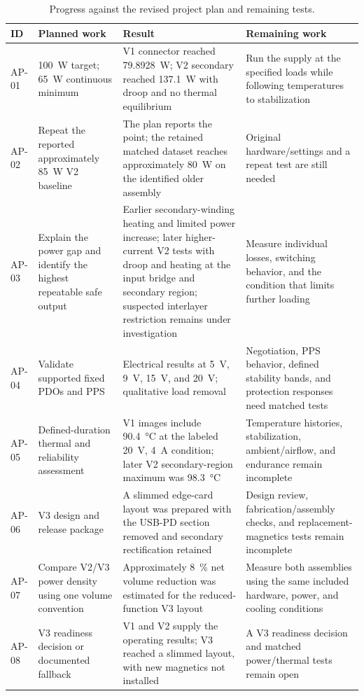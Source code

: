 \begin{table}[htbp]
\centering
\caption[Progress against the revised plan.]{Progress against the revised project plan and remaining tests.}
\label{tab:revised-plan-results-status}
\scriptsize
\begin{tabularx}{\textwidth}{@{}L{0.07\textwidth}L{0.24\textwidth}Y L{0.23\textwidth}@{}}
\toprule
ID & Planned work & Result & Remaining work\\
\midrule
AP-01 & \SI{100}{\watt} target; \SI{65}{\watt} continuous minimum & V1 connector reached \SI{79.8928}{\watt}; V2 secondary reached \SI{137.1}{\watt} with droop and no thermal equilibrium & Run the supply at the specified loads while following temperatures to stabilization\\
AP-02 & Repeat the reported approximately \SI{85}{\watt} V2 baseline & The plan reports the point; the retained matched dataset reaches approximately \SI{80}{\watt} on the identified older assembly & Original hardware/settings and a repeat test are still needed\\
AP-03 & Explain the power gap and identify the highest repeatable safe output & Earlier secondary-winding heating and limited power increase; later higher-current V2 tests with droop and heating at the input bridge and secondary region; suspected interlayer restriction remains under investigation & Measure individual losses, switching behavior, and the condition that limits further loading\\
AP-04 & Validate supported fixed PDOs and PPS & Electrical results at \SI{5}{\volt}, \SI{9}{\volt}, \SI{15}{\volt}, and \SI{20}{\volt}; qualitative load removal & Negotiation, PPS behavior, defined stability bands, and protection responses need matched tests\\
AP-05 & Defined-duration thermal and reliability assessment & V1 images include \SI{90.4}{\celsius} at the labeled \SI{20}{\volt}, \SI{4}{\ampere} condition; later V2 secondary-region maximum was \SI{98.3}{\celsius} & Temperature histories, stabilization, ambient/airflow, and endurance remain incomplete\\
AP-06 & V3 design and release package & A slimmed edge-card layout was prepared with the USB-PD section removed and secondary rectification retained & Design review, fabrication/assembly checks, and replacement-magnetics tests remain incomplete\\
AP-07 & Compare V2/V3 power density using one volume convention & Approximately \SI{8}{\percent} net volume reduction was estimated for the reduced-function V3 layout & Measure both assemblies using the same included hardware, power, and cooling conditions\\
AP-08 & V3 readiness decision or documented fallback & V1 and V2 supply the operating results; V3 reached a slimmed layout, with new magnetics not installed & A V3 readiness decision and matched power/thermal tests remain open\\
\bottomrule
\end{tabularx}
\end{table}
\FloatBarrier

